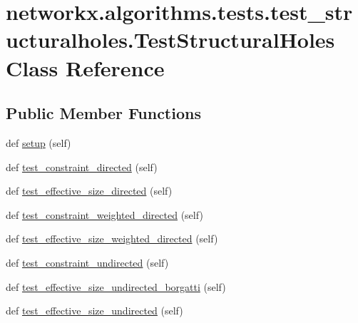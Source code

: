 \hypertarget{classnetworkx_1_1algorithms_1_1tests_1_1test__structuralholes_1_1TestStructuralHoles}{}\section{networkx.\+algorithms.\+tests.\+test\+\_\+structuralholes.\+Test\+Structural\+Holes Class Reference}
\label{classnetworkx_1_1algorithms_1_1tests_1_1test__structuralholes_1_1TestStructuralHoles}
\subsection*{Public Member Functions}
\begin{DoxyCompactItemize}
\item 
def \hyperlink{classnetworkx_1_1algorithms_1_1tests_1_1test__structuralholes_1_1TestStructuralHoles_a0c5713a9703c90612028effa3c82839e}{setup} (self)
\item 
def \hyperlink{classnetworkx_1_1algorithms_1_1tests_1_1test__structuralholes_1_1TestStructuralHoles_a2a8fb64d4b1fb98b377d145d49c48814}{test\+\_\+constraint\+\_\+directed} (self)
\item 
def \hyperlink{classnetworkx_1_1algorithms_1_1tests_1_1test__structuralholes_1_1TestStructuralHoles_ae8c03e9fe87268ceb1b81d895fb4f7dd}{test\+\_\+effective\+\_\+size\+\_\+directed} (self)
\item 
def \hyperlink{classnetworkx_1_1algorithms_1_1tests_1_1test__structuralholes_1_1TestStructuralHoles_af6aa371fdaea9222457dbf02b6fbaa6c}{test\+\_\+constraint\+\_\+weighted\+\_\+directed} (self)
\item 
def \hyperlink{classnetworkx_1_1algorithms_1_1tests_1_1test__structuralholes_1_1TestStructuralHoles_a39de742df7ff5c875d11d7de6127bdd6}{test\+\_\+effective\+\_\+size\+\_\+weighted\+\_\+directed} (self)
\item 
def \hyperlink{classnetworkx_1_1algorithms_1_1tests_1_1test__structuralholes_1_1TestStructuralHoles_af275c1721cb7700a0b9750ecad4b701a}{test\+\_\+constraint\+\_\+undirected} (self)
\item 
def \hyperlink{classnetworkx_1_1algorithms_1_1tests_1_1test__structuralholes_1_1TestStructuralHoles_a424f557bd38bf5476aca71966dd90933}{test\+\_\+effective\+\_\+size\+\_\+undirected\+\_\+borgatti} (self)
\item 
def \hyperlink{classnetworkx_1_1algorithms_1_1tests_1_1test__structuralholes_1_1TestStructuralHoles_a7d3170b15cf205b2e6c95b54515d336c}{test\+\_\+effective\+\_\+size\+\_\+undirected} (self)

\end{DoxyCompactItemize}
